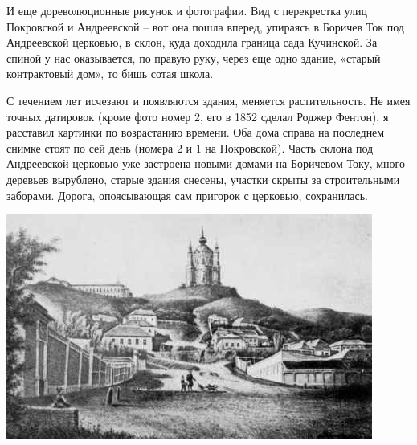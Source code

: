 И еще дореволюционные рисунок и фотографии. Вид с перекрестка улиц Покровской и Андреевской – вот она пошла вперед, упираясь в Боричев Ток под Андреевской церковью, в склон, куда доходила граница сада Кучинской. За спиной у нас оказывается, по правую руку, через еще одно здание, «старый контрактовый дом», то бишь сотая школа.

С течением лет исчезают и появляются здания, меняется растительность. Не имея точных датировок (кроме фото номер 2, его в 1852 сделал Роджер Фентон), я расставил картинки по возрастанию времени. Оба дома справа на последнем снимке стоят по сей день (номера 2 и 1 на Покровской). Часть склона под Андреевской церковью уже застроена новыми домами на Боричевом Току, много деревьев вырублено, старые здания снесены, участки скрыты за строительными заборами. Дорога, опоясывающая сам пригорок с церковью, сохранилась.




\begin{center}
\includegraphics[width=0.96\linewidth]{chast-colebanie-osnov/borichev-tok/kuch03.jpg}
\end{center}

\newpage

\vspace*{\fill}

